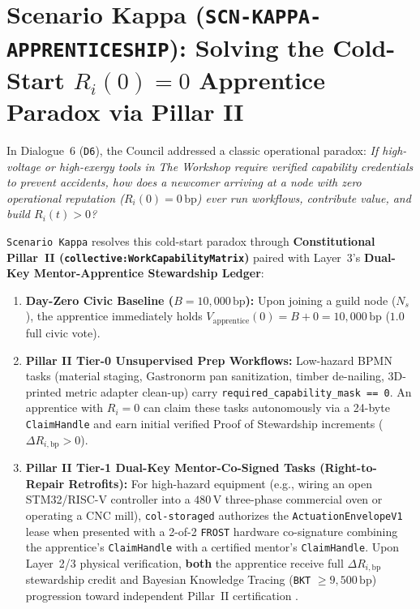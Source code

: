 \section{Scenario Kappa (\texttt{SCN-KAPPA-APPRENTICESHIP}): Solving the Cold-Start $R_i(0) = 0$ Apprentice Paradox via Pillar II}
\label{sec:ch11-kappa}

In Dialogue~6 (\texttt{D6}), the Council addressed a classic operational paradox: \textit{If high-voltage or high-exergy tools in \textit{The Workshop} require verified capability credentials to prevent accidents, how does a newcomer arriving at a node with zero operational reputation ($R_i(0) = 0\,\mathrm{bp}$) ever run workflows, contribute value, and build $R_i(t) > 0$?}

\texttt{Scenario Kappa} resolves this cold-start paradox through \textbf{Constitutional Pillar~II (\texttt{collective:WorkCapabilityMatrix})} paired with Layer~3's \textbf{Dual-Key Mentor-Apprentice Stewardship Ledger}:
\begin{enumerate}
    \item \textbf{Day-Zero Civic Baseline ($B = 10{,}000\,\mathrm{bp}$):} Upon joining a guild node ($N_s$), the apprentice immediately holds $V_{\mathrm{apprentice}}(0) = B + 0 = 10{,}000\,\mathrm{bp}$ ($1.0$ full civic vote).
    \item \textbf{Pillar II Tier-0 Unsupervised Prep Workflows:} Low-hazard BPMN tasks (material staging, Gastronorm pan sanitization, timber de-nailing, 3D-printed metric adapter clean-up) carry \texttt{required\_capability\_mask == 0}. An apprentice with $R_i = 0$ can claim these tasks autonomously via a 24-byte \texttt{ClaimHandle} and earn initial verified Proof of Stewardship increments ($\Delta R_{i,\mathrm{bp}} > 0$).
    \item \textbf{Pillar II Tier-1 Dual-Key Mentor-Co-Signed Tasks (Right-to-Repair Retrofits):} For high-hazard equipment (e.g., wiring an open STM32/RISC-V controller into a $480\,\mathrm{V}$ three-phase commercial oven or operating a CNC mill), \texttt{col-storaged} authorizes the \texttt{ActuationEnvelopeV1} lease when presented with a 2-of-2 \texttt{FROST} hardware co-signature combining the apprentice's \texttt{ClaimHandle} with a certified mentor's \texttt{ClaimHandle}. Upon Layer~2/3 physical verification, \textbf{both} the apprentice receive full $\Delta R_{i,\mathrm{bp}}$ stewardship credit and Bayesian Knowledge Tracing (\texttt{BKT} $\ge 9{,}500\,\mathrm{bp}$) progression toward independent Pillar~II certification \parencite{corbett1995bkt,komlo2020frost}.
\end{enumerate}

